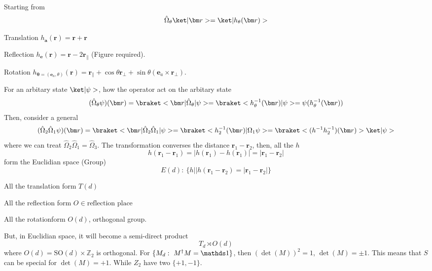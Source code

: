 Starting from
\[
  \hat\Omega_\theta \ket|\bm r> = \ket|h_\theta(\bm r)>
\]
\begin{example}\leavevmode
  \begin{enumext}
    \item Translation $h_{\bm a} (\bm r) = \bm r + \bm r$
    \item Reflection $h_{\bm e}(\bm r) = \bm r - 2\bm r_\parallel$
          (Figure required).
    \item Rotation $h_{\bm\theta = (\bm e_a, \theta)}(\bm r)
    = \bm r_\parallel + \cos\theta\bm r_\bot
    + \sin\theta(\bm e_a \times \bm r_\bot)$.
  \end{enumext}
  For an arbitary state $\ket|\psi>$, how the operator act on the arbitary state
  \[
    (\hat\Omega_\theta\psi)(\bm r)
  = \braket<\bm r|\hat\Omega_\theta|\psi>
  = \braket<h_\theta^{-1}(\bm r)|\psi> = \psi(h_\theta^{-1}(\bm r))
  \]
  Then, consider a general
  \[
    (\hat\Omega_2\hat\Omega_1\psi)(\bm r)
  = \braket<\bm r|\hat\Omega_2\hat\Omega_1|\psi>
  = \braket<h_2^{-1}(\bm r)|\Omega_1\psi>
  = \braket<(h^{-1}h_2^{-1})(\bm r)> \ket|\psi>
  \]
  where we can treat $\hat\Omega_2\hat\Omega_1 = \hat\Omega_3$.
  The transformation converses the distance $\bm r_1 - \bm r_2$,
  then, all the $h$
  \[
    h(\bm r_1 - \bm r_1) = |h(\bm r_1) - h(\bm r_1)| = |\bm r_1 - \bm r_2|
  \]
  form the Euclidian space (Group)
  \begin{equation}
    E(d):\ \{h||h(\bm r_1 - \bm r_2) = |\bm r_1 - \bm r_2|\}
  \end{equation}
  \begin{enumext}
    \item All the translation form $T(d)$
    \item All the reflection form $O \in \text{reflection place}$
    \item All the rotationform $O(d)$, orthogonal group.
  \end{enumext}
  But, in Euclidian space, it will become a semi-direct product
  \[
    T_d \rtimes O(d)
  \]
  where $O(d) = \text{SO}(d) \times \mathbb Z_2$ is orthogonal.
  For $\{M_d:\ M^\dagger M = \identity\}$, then $(\det(M))^2 = 1$,
  $\det(M) = \pm 1$. This means that $S$ can be special for $\det(M) = +1$.
  While $Z_2$ have two $\{+1, -1\}$.
\end{example}

